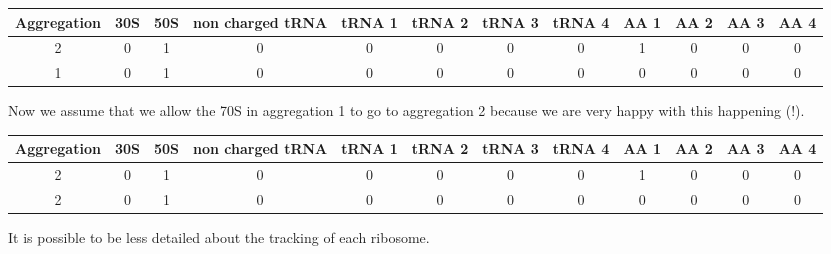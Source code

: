 \begin{center}
  \tiny
  \begin{tabular}{|c|c|c|c|c|c|c|c|c|c|c|c|}
    \hline
    Aggregation & 30S & 50S & non charged tRNA & tRNA 1 & tRNA 2 & tRNA 3 & tRNA 4 & AA 1 & AA 2 & AA 3 & AA 4 \\
    \hline
         2      &  0 & 1 & 0 & 0 & 0 & 0 & 0 & 1 & 0 & 0 & 0 \\
         1      &  0 & 1 & 0 & 0 & 0 & 0 & 0 & 0 & 0 & 0 & 0 \\
    \hline
  \end{tabular}
\end{center}
Now we assume that we allow the 70S in aggregation 1 to go to aggregation 2 because we are very happy with this happening (!).
\begin{center}
  \tiny
  \begin{tabular}{|c|c|c|c|c|c|c|c|c|c|c|c|}
    \hline
    Aggregation & 30S & 50S & non charged tRNA & tRNA 1 & tRNA 2 & tRNA 3 & tRNA 4 & AA 1 & AA 2 & AA 3 & AA 4 \\
    \hline
         2      &  0 & 1 & 0 & 0 & 0 & 0 & 0 & 1 & 0 & 0 & 0 \\
         2      &  0 & 1 & 0 & 0 & 0 & 0 & 0 & 0 & 0 & 0 & 0 \\
    \hline
  \end{tabular}
\end{center}
It is possible to be less detailed about the tracking of each ribosome.
